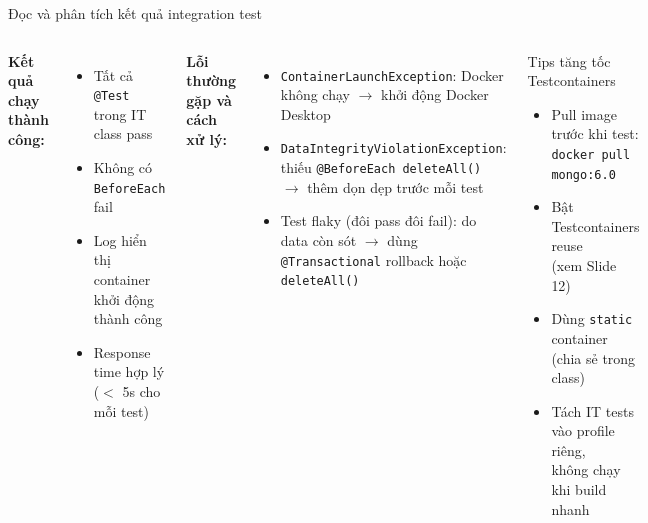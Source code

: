 \documentclass[aspectratio=169,10pt]{beamer}
\begin{document}
\begin{frame}{Đọc và phân tích kết quả integration test}
  \begin{columns}
    \textbf{Kết quả chạy thành công:}
    \begin{itemize}
      \item Tất cả \texttt{@Test} trong IT class pass
      \item Không có \texttt{BeforeEach} fail
      \item Log hiển thị container khởi động thành công
      \item Response time hợp lý ($<$ 5s cho mỗi test)
    \end{itemize}

    \vspace{0.3em}
    \textbf{Lỗi thường gặp và cách xử lý:}
    \begin{itemize}
      \item \texttt{ContainerLaunchException}: Docker không chạy
        $\to$ khởi động Docker Desktop
      \item \texttt{DataIntegrityViolationException}: thiếu \texttt{@BeforeEach deleteAll()}
        $\to$ thêm dọn dẹp trước mỗi test
      \item Test flaky (đôi pass đôi fail): do data còn sót
        $\to$ dùng \texttt{@Transactional} rollback hoặc \texttt{deleteAll()}
    \end{itemize}

    \begin{block}{Tips tăng tốc Testcontainers}
      \begin{itemize}
        \item Pull image trước khi test:\\
          \texttt{docker pull mongo:6.0}
        \item Bật Testcontainers reuse\\
          (xem Slide 12)
        \item Dùng \texttt{static} container\\
          (chia sẻ trong class)
        \item Tách IT tests vào profile riêng,\\
          không chạy khi build nhanh
      \end{itemize}
    \end{block}
  \end{columns}
\end{frame}
\end{document}
